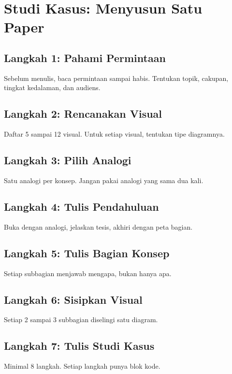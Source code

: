 \documentclass[11pt,a4paper]{article}
\begin{document}
\section{Studi Kasus: Menyusun Satu Paper}

\subsection{Langkah 1: Pahami Permintaan}

Sebelum menulis, baca permintaan sampai habis. Tentukan topik, cakupan, tingkat kedalaman, dan audiens.

\subsection{Langkah 2: Rencanakan Visual}

Daftar 5 sampai 12 visual. Untuk setiap visual, tentukan tipe diagramnya.

\subsection{Langkah 3: Pilih Analogi}

Satu analogi per konsep. Jangan pakai analogi yang sama dua kali.

\subsection{Langkah 4: Tulis Pendahuluan}

Buka dengan analogi, jelaskan tesis, akhiri dengan peta bagian.

\subsection{Langkah 5: Tulis Bagian Konsep}

Setiap subbagian menjawab mengapa, bukan hanya apa.

\subsection{Langkah 6: Sisipkan Visual}

Setiap 2 sampai 3 subbagian diselingi satu diagram.

\subsection{Langkah 7: Tulis Studi Kasus}

Minimal 8 langkah. Setiap langkah punya blok kode.
\end{document}
